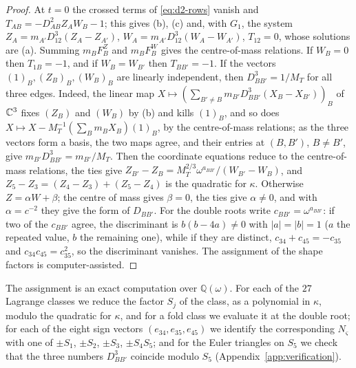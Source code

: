 \begin{proof}
At $t=0$ the crossed terms of \eqref{eq:d2-rows} vanish and $T_{AB}=-D_{AB}^2Z_AW_B-1$; this
gives (b), (c) and, with $G_1$, the system $Z_A=m_{A'}D_{12}^3(Z_A-Z_{A'})$,
$W_A=m_{A'}D_{12}^3(W_A-W_{A'})$, $T_{12}=0$, whose solutions are (a).  Summing $m_BF^Z_B$ and
$m_BF^W_B$ gives the centre-of-mass relations.  If $W_B=0$ then $T_{1B}=-1$, and if
$W_B=W_{B'}$ then $T_{BB'}=-1$.  If the vectors $(1)_B,(Z_B)_B,(W_B)_B$ are linearly independent,
then $D_{BB'}^3=1/M_T$ for all three edges.  Indeed, the linear map
$X\mapsto(\sum_{B'\ne B}m_{B'}D_{BB'}^3(X_B-X_{B'}))_B$ of $\mathbb{C}^3$ fixes $(Z_B)$ and $(W_B)$ by (b)
and kills $(1)_B$, and so does $X\mapsto X-M_T^{-1}(\sum_Bm_BX_B)(1)_B$, by the centre-of-mass
relations; as the three vectors form a basis, the two maps agree, and their entries at
$(B,B')$, $B\ne B'$, give $m_{B'}D_{BB'}^3=m_{B'}/M_T$.  Then the coordinate equations
reduce to the centre-of-mass relations, the ties give
$Z_{B'}-Z_B=M_T^{2/3}\omega^{a_{BB'}}/(W_{B'}-W_B)$, and $Z_5-Z_3=(Z_4-Z_3)+(Z_5-Z_4)$ is the
quadratic for $\kappa$.  Otherwise $Z=\alpha W+\beta$; the centre of mass gives $\beta=0$, the
ties give $\alpha\ne0$, and with $\alpha=c^{-2}$ they give the form of $D_{BB'}$.  For the double
roots write $c_{BB'}=\omega^{a_{BB'}}$: if two of the $c_{BB'}$ agree, the discriminant is
$b(b-4a)\ne0$ with $|a|=|b|=1$ ($a$ the repeated value, $b$ the remaining one), while if they are
distinct, $c_{34}+c_{45}=-c_{35}$ and $c_{34}c_{45}=c_{35}^2$, so the discriminant vanishes.  The
assignment of the shape factors is computer-assisted.
\end{proof}

The assignment is an exact computation over $\mathbb Q(\omega)$.  For each of the $27$ Lagrange
classes we reduce the factor $S_j$ of the class, as a polynomial in $\kappa$, modulo the quadratic
for $\kappa$, and for a fold class we evaluate it at the double root; for each of the eight sign
vectors $(e_{34},e_{35},e_{45})$ we identify the corresponding $N_\varsigma$ with one of $\pm S_1$,
$\pm S_2$, $\pm S_3$, $\pm S_4S_5$; and for the Euler triangles on $S_5$ we check that the three
numbers $D_{BB'}^3$ coincide modulo $S_5$ (Appendix~\ref{app:verification}).


